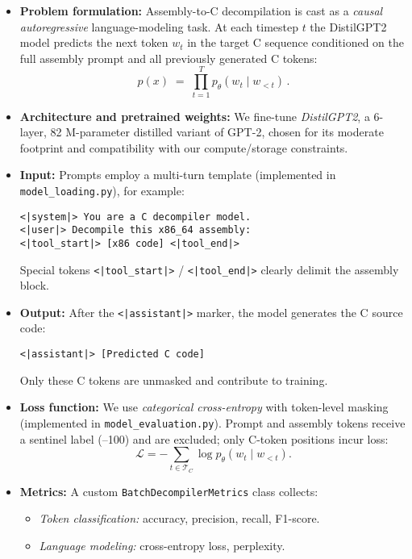 \documentclass[../main.tex]{subfiles}
\begin{document}
\begin{itemize}
  \item \textbf{Problem formulation:}  
    Assembly-to-C decompilation is cast as a \emph{causal autoregressive} language-modeling task. At each timestep \(t\) the DistilGPT2 model predicts the next token \(w_t\) in the target C sequence conditioned on the full assembly prompt and all previously generated C tokens:
    \[
      p(x) \;=\;\prod_{t=1}^{T} p_\theta(w_t \mid w_{<t})\,.
    \]

  \item \textbf{Architecture and pretrained weights:}  
    We fine-tune \emph{DistilGPT2}, a 6-layer, 82 M-parameter distilled variant of GPT-2, chosen for its moderate footprint and compatibility with our compute/storage constraints.

  \item \textbf{Input:}  
    Prompts employ a multi-turn template (implemented in \texttt{model\_loading.py}), for example:
    \begin{verbatim}
<|system|> You are a C decompiler model.
<|user|> Decompile this x86_64 assembly:
<|tool_start|> [x86 code] <|tool_end|>
    \end{verbatim}
    Special tokens \texttt{<|tool\_start|>} / \texttt{<|tool\_end|>} clearly delimit the assembly block.

  \item \textbf{Output:}  
    After the \texttt{<|assistant|>} marker, the model generates the C source code:
    \begin{verbatim}
<|assistant|> [Predicted C code]
    \end{verbatim}
    Only these C tokens are unmasked and contribute to training.

  \item \textbf{Loss function:}  
    We use \emph{categorical cross-entropy} with token-level masking (implemented in \texttt{model\_evaluation.py}). Prompt and assembly tokens receive a sentinel label (–100) and are excluded; only C-token positions incur loss:
    \[
      \mathcal{L} = -\!\!\sum_{t \in \mathcal{T}_C}\log p_\theta(w_t \mid w_{<t}).
    \]

  \item \textbf{Metrics:}  
    A custom \texttt{BatchDecompilerMetrics} class collects:
    \begin{itemize}
      \item \emph{Token classification:} accuracy, precision, recall, F1-score.
      \item \emph{Language modeling:} cross-entropy loss, perplexity.
    \end{itemize}
\end{itemize}
\end{document}
